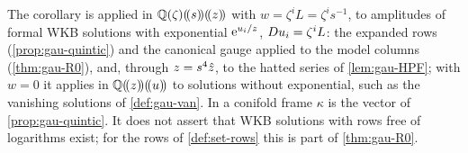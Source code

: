 The corollary is applied in $\mathbb{Q}(\zeta)(\!(s)\!)(\!(z)\!)$ with $w=\zeta^iL=\zeta^is^{-1}$, to amplitudes of formal WKB solutions with exponential $\mathrm{e}^{u_i/z}$, $D u_i=\zeta^iL$: the expanded rows (\cref{prop:gau-quintic}) and the canonical gauge applied to the model columns (\cref{thm:gau-R0}), and, through $z=s^4\hat{z}$, to the hatted series of \cref{lem:gau-HPF}; with $w=0$ it applies in $\mathbb{Q}(\!(z)\!)(\!(u)\!)$ to solutions without exponential, such as the vanishing solutions of \cref{def:gau-van}. In a conifold frame $\kappa$ is the vector of \cref{prop:gau-quintic}. It does not assert that WKB solutions with rows free of logarithms exist; for the rows of \cref{def:set-rows} this is part of \cref{thm:gau-R0}.


